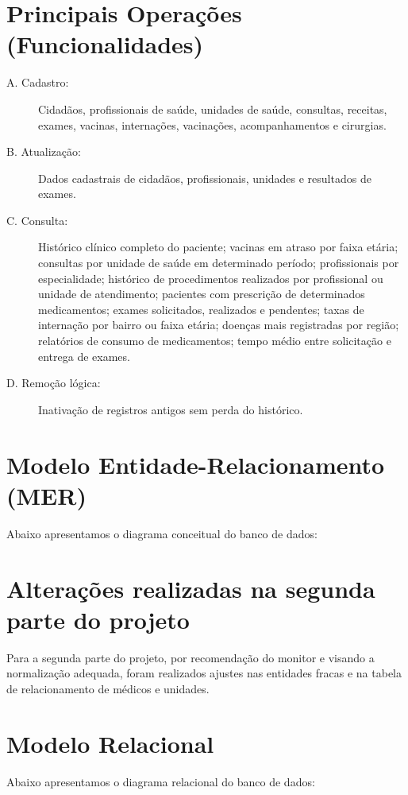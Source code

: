 \documentclass[12pt, a4paper]{article}
\begin{document}
\section{Principais Operações (Funcionalidades)}
\begin{description}
    \item[A. Cadastro:] Cidadãos, profissionais de saúde, unidades de saúde, consultas, receitas, exames, vacinas, internações, vacinações, acompanhamentos e cirurgias.
    
    \item[B. Atualização:] Dados cadastrais de cidadãos, profissionais, unidades e resultados de exames.
    
    \item[C. Consulta:] Histórico clínico completo do paciente; vacinas em atraso por faixa etária; consultas por unidade de saúde em determinado período; profissionais por especialidade; histórico de procedimentos realizados por profissional ou unidade de atendimento; pacientes com prescrição de determinados medicamentos; exames solicitados, realizados e pendentes; taxas de internação por bairro ou faixa etária; doenças mais registradas por região; relatórios de consumo de medicamentos; tempo médio entre solicitação e entrega de exames.
    
    \item[D. Remoção lógica:] Inativação de registros antigos sem perda do histórico.
\end{description}

\section{Modelo Entidade-Relacionamento (MER)}
Abaixo apresentamos o diagrama conceitual do banco de dados:



\section{Alterações realizadas na segunda parte do projeto}
Para a segunda parte do projeto, por recomendação do monitor e visando a normalização adequada, foram realizados ajustes nas entidades fracas e na tabela de relacionamento de médicos e unidades.

\section{Modelo Relacional}
Abaixo apresentamos o diagrama relacional do banco de dados:
\end{document}
